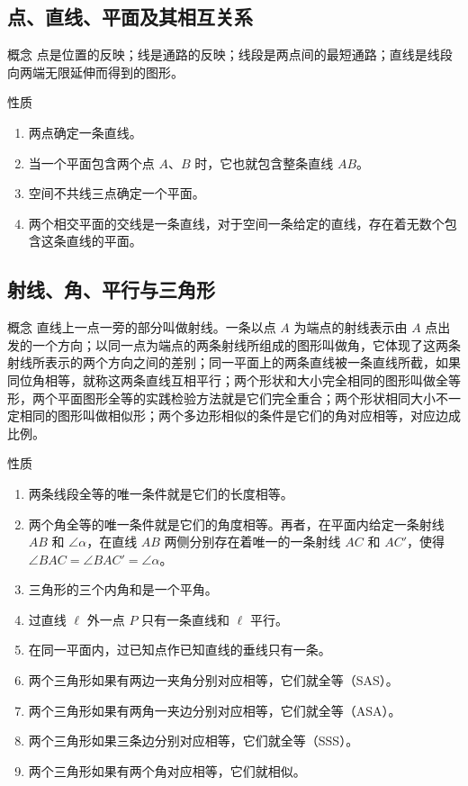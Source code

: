 \subsection*{点、直线、平面及其相互关系}

\begin{Reading}[]{概念} 
点是位置的反映；线是通路的反映；线段是两点间的最短通路；直线是线段向两端无限延伸而得到的图形。
\end{Reading}

\begin{Reading}[]{性质}
\begin{enumerate}
	\item 两点确定一条直线。
	\item 当一个平面包含两个点 $A$、$B$ 时，它也就包含整条直线 $AB$。
	\item 空间不共线三点确定一个平面。
	\item 两个相交平面的交线是一条直线，对于空间一条给定的直线，存在着无数个包含这条直线的平面。
\end{enumerate}
\end{Reading}

\subsection*{射线、角、平行与三角形}

\begin{Reading}[]{概念}
直线上一点一旁的部分叫做射线。一条以点 $A$ 为端点的射线表示由 $A$ 点出发的一个方向；以同一点为端点的两条射线所组成的图形叫做角，它体现了这两条射线所表示的两个方向之间的差别；同一平面上的两条直线被一条直线所截，如果同位角相等，就称这两条直线互相平行；两个形状和大小完全相同的图形叫做全等形，两个平面图形全等的实践检验方法就是它们完全重合；两个形状相同大小不一定相同的图形叫做相似形；两个多边形相似的条件是它们的角对应相等，对应边成比例。
\end{Reading}

\begin{Reading}[]{性质}
\begin{enumerate}
	\item 两条线段全等的唯一条件就是它们的长度相等。
	\item 两个角全等的唯一条件就是它们的角度相等。再者，在平面内给定一条射线 $AB$ 和 $\angle \alpha$，在直线 $AB$ 两侧分别存在着唯一的一条射线 $AC$ 和 $AC'$，使得 $\angle BAC=\angle BAC'=\angle\alpha$。
	\item 三角形的三个内角和是一个平角。
	\item 过直线 $\ell$ 外一点 $P$ 只有一条直线和 $\ell$ 平行。
	\item 在同一平面内，过已知点作已知直线的垂线只有一条。
	\item 两个三角形如果有两边一夹角分别对应相等，它们就全等（SAS）。
	\item 两个三角形如果有两角一夹边分别对应相等，它们就全等（ASA）。
	\item 两个三角形如果三条边分别对应相等，它们就全等（SSS）。
	\item 两个三角形如果有两个角对应相等，它们就相似。
\end{enumerate}
\end{Reading}

